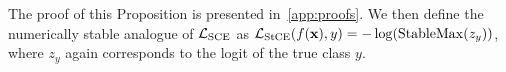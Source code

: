 The proof of this Proposition is presented in~\cref{app:proofs}.
We then define the numerically stable analogue of $\mathcal{L}_{\mathrm{SCE}}$ as $\mathcal{L}_{\mathrm{StCE}}(f(\textbf{x}), y) = -\log(\mathrm{StableMax}(z_y))$, where $z_y$ again corresponds to the logit of the true class $y$.

